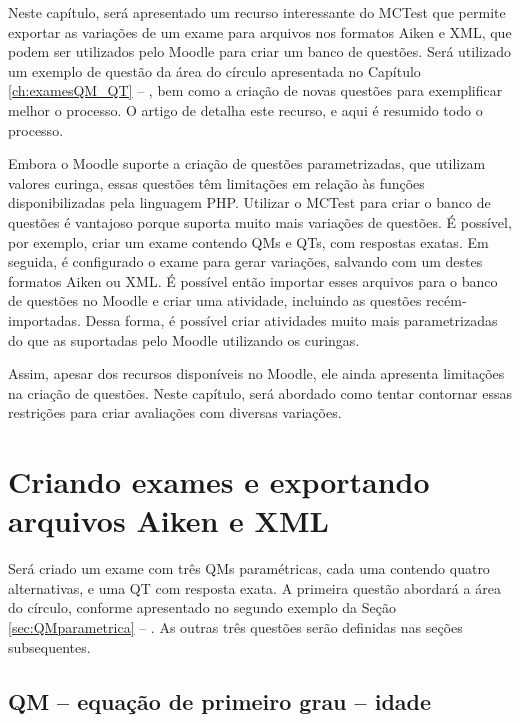  \label{ch:examesQM_QT_Moodle}

Neste capítulo, será apresentado um recurso interessante do MCTest que permite exportar as variações de um exame para arquivos nos formatos Aiken e XML, que podem ser utilizados pelo Moodle para criar um banco de questões. Será utilizado um exemplo de questão da área do círculo apresentada no Capítulo \ref{ch:examesQM_QT} -- , bem como a criação de novas questões para exemplificar melhor o processo. O artigo de  detalha este recurso, e aqui é resumido todo o processo.

Embora o Moodle suporte a criação de questões parametrizadas, que utilizam valores curinga, essas questões têm limitações em relação às funções disponibilizadas pela linguagem PHP. Utilizar o MCTest para criar o banco de questões é vantajoso porque suporta muito mais variações de questões. É possível, por exemplo, criar um exame contendo QMs e QTs, com respostas exatas. Em seguida, é configurado o exame para gerar variações, salvando com um destes formatos Aiken ou XML. É possível então importar esses arquivos para o banco de questões no Moodle e criar uma atividade, incluindo as questões recém-importadas. Dessa forma, é possível criar atividades muito mais parametrizadas do que as suportadas pelo Moodle utilizando os curingas.

Assim, apesar dos recursos disponíveis no Moodle, ele ainda apresenta limitações na criação de questões. Neste capítulo, será abordado como tentar contornar essas restrições para criar avaliações com diversas variações.

\section{Criando exames e exportando arquivos Aiken e XML}

Será criado um exame com três QMs paramétricas, cada uma contendo quatro alternativas, e uma QT com resposta exata. A primeira questão abordará a área do círculo, conforme apresentado no segundo exemplo da Seção \ref{sec:QMparametrica} -- . As outras três questões serão definidas nas seções subsequentes.

\subsection{QM -- equação de primeiro grau -- idade}

